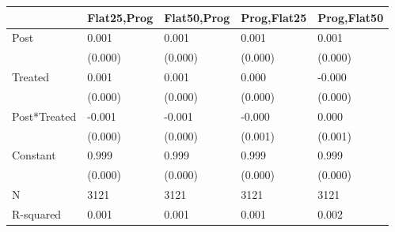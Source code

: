 \begin{tabular}{lllll}
\toprule
 & Flat25,Prog & Flat50,Prog & Prog,Flat25 & Prog,Flat50 \\
\midrule
Post & 0.001 & 0.001 & 0.001 & 0.001 \\
 & (0.000) & (0.000) & (0.000) & (0.000) \\
Treated & 0.001 & 0.001 & 0.000 & -0.000 \\
 & (0.000) & (0.000) & (0.000) & (0.000) \\
Post*Treated & -0.001 & -0.001 & -0.000 & 0.000 \\
 & (0.000) & (0.000) & (0.001) & (0.001) \\
Constant & 0.999 & 0.999 & 0.999 & 0.999 \\
 & (0.000) & (0.000) & (0.000) & (0.000) \\
N & 3121 & 3121 & 3121 & 3121 \\
R-squared & 0.001 & 0.001 & 0.001 & 0.002 \\
\bottomrule
\end{tabular}
